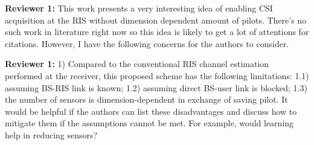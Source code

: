 \documentclass[a4paper,12pt]{article}
\begin{document}
{\textbf{Reviewer 1:}}
This work presents a very interesting idea of enabling CSI acquisition at the RIS without dimension dependent amount of pilots. There's no such work in literature right now so this idea is likely to get a lot of attentions for citations. However, I have the following concerns for the authors to consider. 

{}

\textbf{Reviewer 1:}
1) Compared to the conventional RIS channel estimation performed at the receiver, this proposed scheme has the following limitations: 1.1) assuming BS-RIS link is known; 1.2) assuming direct BS-user link is blocked; 1.3) the number of sensors is dimension-dependent in exchange of saving pilot. It would be helpful if the authors can list these disadvantages and discuss how to mitigate them if the assumptions cannot be met. For example, would learning help in reducing sensors?
\end{document}
